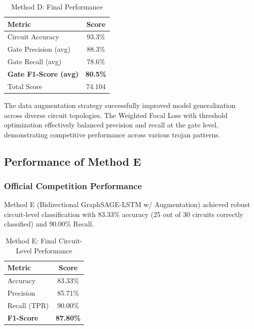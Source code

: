 \documentclass[conference]{IEEEtran}
\begin{document}
\begin{table}[h!]
    \centering
    \caption{Method D: Final Performance}
    \label{tab:competition_results_D}
    \begin{tabular}{lc}
        \toprule
        \textbf{Metric} & \textbf{Score} \\ \midrule
        Circuit Accuracy & 93.3\% \\
        Gate Precision (avg) & 88.3\% \\
        Gate Recall (avg) & 78.6\% \\
        \textbf{Gate F1-Score (avg)} & \textbf{80.5\%} \\
        Total Score & 74.104 \\ \bottomrule
    \end{tabular}
\end{table}

The data augmentation strategy successfully improved model generalization across diverse circuit topologies. The Weighted Focal Loss with threshold optimization effectively balanced precision and recall at the gate level, demonstrating competitive performance across various trojan patterns.

\subsection{Performance of Method E}
\subsubsection{Official Competition Performance}
Method E (Bidirectional GraphSAGE-LSTM w/ Augmentation) 
achieved robust circuit-level classification with 83.33\% accuracy (25 out of 30 circuits correctly classified)
and 90.00\% Recall. 

\begin{table}[h!]
    \centering
    \caption{Method E: Final Circuit-Level Performance}
    \label{tab:competition_results_E}
    \begin{tabular}{lc}
        \toprule
        \textbf{Metric} & \textbf{Score} \\ \midrule
        Accuracy & 83.33\% \\
        Precision & 85.71\% \\
        Recall (TPR) & 90.00\% \\
        \textbf{F1-Score} & \textbf{87.80\%} \\\bottomrule
    \end{tabular}
\end{table}
\end{document}
